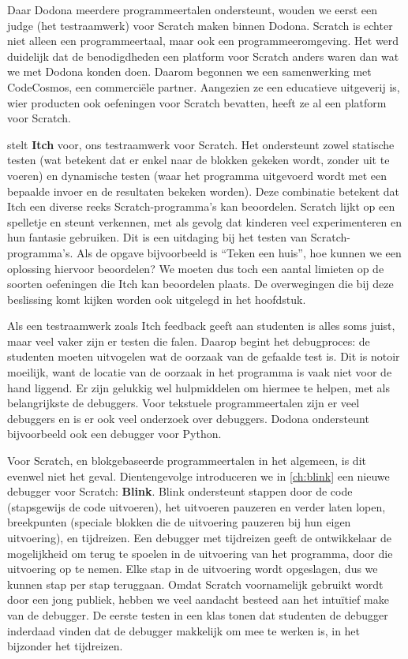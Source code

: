 \documentclass[main]{subfiles}
\begin{document}
Daar Dodona meerdere programmeertalen ondersteunt, wouden we eerst een judge (het testraamwerk) voor Scratch maken binnen Dodona.
Scratch is echter niet alleen een programmeertaal, maar ook een programmeeromgeving.
Het werd duidelijk dat de benodigdheden een platform voor Scratch anders waren dan wat we met Dodona konden doen.
Daarom begonnen we een samenwerking met CodeCosmos, een commerciële partner.
Aangezien ze een educatieve uitgeverij is, wier producten ook oefeningen voor Scratch bevatten, heeft ze al een platform voor Scratch.

 stelt \textbf{Itch} voor, ons testraamwerk voor Scratch.
Het ondersteunt zowel statische testen (wat betekent dat er enkel naar de blokken gekeken wordt, zonder uit te voeren) en dynamische testen (waar het programma uitgevoerd wordt met een bepaalde invoer en de resultaten bekeken worden).
Deze combinatie betekent dat Itch een diverse reeks Scratch-programma's kan beoordelen.
Scratch lijkt op een spelletje en steunt verkennen, met als gevolg dat kinderen veel experimenteren en hun fantasie gebruiken.
Dit is een uitdaging bij het testen van Scratch-programma's.
Als de opgave bijvoorbeeld is ``Teken een huis'', hoe kunnen we een oplossing hiervoor beoordelen?
We moeten dus toch een aantal limieten op de soorten oefeningen die Itch kan beoordelen plaats.
De overwegingen die bij deze beslissing komt kijken worden ook uitgelegd in het hoofdstuk.

Als een testraamwerk zoals Itch feedback geeft aan studenten is alles soms juist, maar veel vaker zijn er testen die falen.
Daarop begint het debugproces: de studenten moeten uitvogelen wat de oorzaak van de gefaalde test is.
Dit is notoir moeilijk, want de locatie van de oorzaak in het programma is vaak niet voor de hand liggend.
Er zijn gelukkig wel hulpmiddelen om hiermee te helpen, met als belangrijkste de debuggers.
Voor tekstuele programmeertalen zijn er veel debuggers en is er ook veel onderzoek over debuggers.
Dodona ondersteunt bijvoorbeeld ook een debugger voor Python.

Voor Scratch, en blokgebaseerde programmeertalen in het algemeen, is dit evenwel niet het geval.
Dientengevolge introduceren we in \cref{ch:blink} een nieuwe debugger voor Scratch: \textbf{Blink}.
Blink ondersteunt stappen door de code (stapsgewijs de code uitvoeren), het uitvoeren pauzeren en verder laten lopen, breekpunten (speciale blokken die de uitvoering pauzeren bij hun eigen uitvoering), en tijdreizen.
Een debugger met tijdreizen geeft de ontwikkelaar de mogelijkheid om terug te spoelen in de uitvoering van het programma, door die uitvoering op te nemen.
Elke stap in de uitvoering wordt opgeslagen, dus we kunnen stap per stap teruggaan.
Omdat Scratch voornamelijk gebruikt wordt door een jong publiek, hebben we veel aandacht besteed aan het intuïtief make van de debugger.
De eerste testen in een klas tonen dat studenten de debugger inderdaad vinden dat de debugger makkelijk om mee te werken is, in het bijzonder het tijdreizen.
\end{document}

